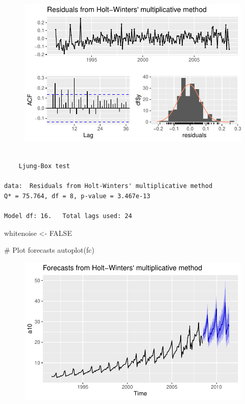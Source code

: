 \documentclass[
  letterpaper,
  DIV=11,
  numbers=noendperiod]{scrartcl}
\newenvironment{Shaded}{\begin{snugshade}}{\end{snugshade}}
\newcommand{\CommentTok}[1]{\textcolor[rgb]{0.37,0.37,0.37}{#1}}
\newcommand{\ConstantTok}[1]{\textcolor[rgb]{0.56,0.35,0.01}{#1}}
\newcommand{\FunctionTok}[1]{\textcolor[rgb]{0.28,0.35,0.67}{#1}}
\newcommand{\NormalTok}[1]{\textcolor[rgb]{0.00,0.23,0.31}{#1}}
\newcommand{\OtherTok}[1]{\textcolor[rgb]{0.00,0.23,0.31}{#1}}
\begin{document}
\begin{figure}[H]

{\centering \includegraphics{forecasting_datacamp_ex_files/figure-pdf/unnamed-chunk-16-2.pdf}

}

\end{figure}

\begin{verbatim}

    Ljung-Box test

data:  Residuals from Holt-Winters' multiplicative method
Q* = 75.764, df = 8, p-value = 3.467e-13

Model df: 16.   Total lags used: 24
\end{verbatim}

\begin{Shaded}
\begin{Highlighting}[]
\NormalTok{whitenoise }\OtherTok{\textless{}{-}} \ConstantTok{FALSE}

\CommentTok{\# Plot forecasts}
\FunctionTok{autoplot}\NormalTok{(fc)}
\end{Highlighting}
\end{Shaded}

\begin{figure}[H]

{\centering \includegraphics{forecasting_datacamp_ex_files/figure-pdf/unnamed-chunk-16-3.pdf}

}

\end{figure}
\end{document}
